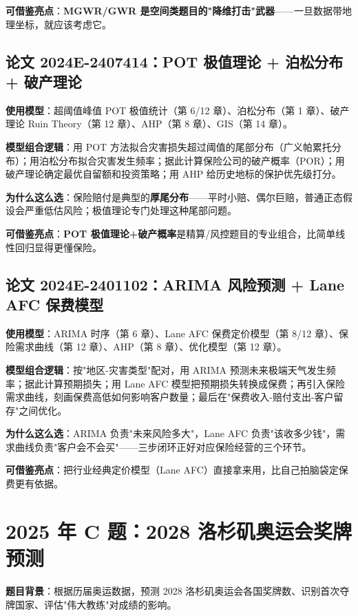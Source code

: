 \textbf{可借鉴亮点}：\textbf{MGWR/GWR 是空间类题目的"降维打击"武器}——一旦数据带地理坐标，就应该考虑它。

\subsection{论文 2024E-2407414：POT 极值理论 + 泊松分布 + 破产理论}
\textbf{使用模型}：超阈值峰值 POT 极值统计（第 6/12 章）、泊松分布（第 1 章）、破产理论 Ruin Theory（第 12 章）、AHP（第 8 章）、GIS（第 14 章）。

\textbf{模型组合逻辑}：用 POT 方法拟合灾害损失超过阈值的尾部分布（广义帕累托分布）；用泊松分布拟合灾害发生频率；据此计算保险公司的破产概率（POR）；用破产理论确定最优自留额和投资策略；用 AHP 给历史地标的保护优先级打分。

\textbf{为什么这么选}：保险赔付是典型的\textbf{厚尾分布}——平时小赔、偶尔巨赔，普通正态假设会严重低估风险；极值理论专门处理这种尾部问题。

\textbf{可借鉴亮点}：\textbf{POT 极值理论+破产概率}是精算/风控题目的专业组合，比简单线性回归显得更懂保险。

\subsection{论文 2024E-2401102：ARIMA 风险预测 + Lane AFC 保费模型}
\textbf{使用模型}：ARIMA 时序（第 6 章）、Lane AFC 保费定价模型（第 8/12 章）、保险需求曲线（第 12 章）、AHP（第 8 章）、优化模型（第 12 章）。

\textbf{模型组合逻辑}：按"地区-灾害类型"配对，用 ARIMA 预测未来极端天气发生频率；据此计算预期损失；用 Lane AFC 模型把预期损失转换成保费；再引入保险需求曲线，刻画保费高低如何影响客户数量；最后在"保费收入-赔付支出-客户留存"之间优化。

\textbf{为什么这么选}：ARIMA 负责"未来风险多大"，Lane AFC 负责"该收多少钱"，需求曲线负责"客户会不会买"——三步闭环正好对应保险经营的三个环节。

\textbf{可借鉴亮点}：把行业经典定价模型（Lane AFC）直接拿来用，比自己拍脑袋定保费更有依据。

\section{2025 年 C 题：2028 洛杉矶奥运会奖牌预测}

\textbf{题目背景}：根据历届奥运数据，预测 2028 洛杉矶奥运会各国奖牌数、识别首次夺牌国家、评估"伟大教练"对成绩的影响。

